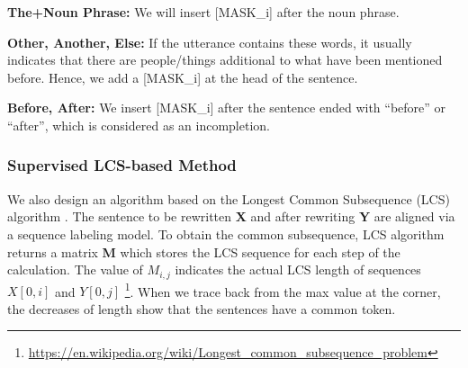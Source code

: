 \noindent
\textbf{The+Noun Phrase:}
We will insert [MASK\_i] after the noun phrase.

\noindent
\textbf{Other, Another, Else:}
If the utterance contains these words,
it usually indicates that
 there are people/things 
additional to what have been mentioned
before.
Hence,
we add a [MASK\_i] 
at the head of the sentence.

\noindent
\textbf{Before, After:}
We insert [MASK\_i] after the sentence 
ended with ``before'' or ``after'',
which is considered as an incompletion.





\subsubsection{Supervised LCS-based Method}
\label{sec:becky-lcs}
We also design an algorithm based on the Longest Common Subsequence (LCS)
algorithm
.
The sentence to be rewritten \textbf{X} and after rewriting \textbf{Y} are aligned via a sequence labeling model. To obtain the common subsequence, LCS algorithm returns a matrix \textbf{M} which stores the LCS sequence for each step of the calculation. The value of $M_{i,j}$ indicates the actual LCS length of sequences $X[0,i]$ and $Y[0,j]$ \footnote{\url{https://en.wikipedia.org/wiki/Longest_common_subsequence_problem}}. 
When we trace back from the max value at the corner, the decreases of length show that the sentences have a common token.

